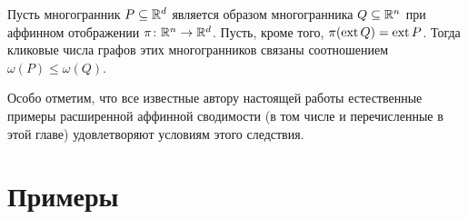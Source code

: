 \begin{corollary}
\label{cor:CliqueOfExtension}
Пусть многогранник $P \subseteq \mathbb{R}^d$ является образом многогранника $Q \subseteq \mathbb{R}^n$ при аффинном отображении $\pi \colon \mathbb{R}^n \to \mathbb{R}^d$.
Пусть, кроме того, $\pi(\operatorname{ext} Q) = \operatorname{ext} P$.
Тогда кликовые числа графов этих многогранников связаны соотношением $\omega(P) \le \omega(Q)$.
\end{corollary}

Особо отметим, что все известные автору настоящей работы естественные примеры расширенной аффинной сводимости (в том числе и перечисленные в этой главе) удовлетворяют условиям этого следствия.

%
%

\section{Примеры}
\label{sec:ExtAffExamples}

